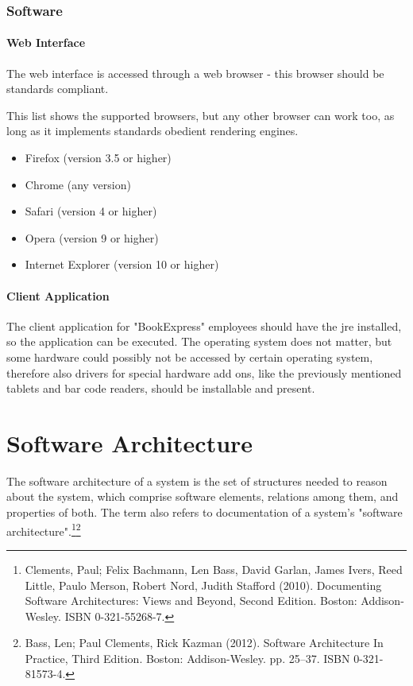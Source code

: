 \documentclass[11pt,a4paper,oneside,svgnames]{report}
\begin{document}
\subsection{Software}
\subsubsection{Web Interface}
The web interface is accessed through a web browser - this browser should be standards compliant.

This list shows the supported browsers, but any other browser can work too, as long as it implements standards obedient rendering engines.

\begin{itemize}
	\item Firefox (version 3.5 or higher)
	\item Chrome (any version)
	\item Safari (version 4 or higher)
	\item Opera (version 9 or higher)
	\item Internet Explorer (version 10 or higher)
\end{itemize}
\subsubsection{Client Application}
The client application for "BookExpress" employees should have the \gls{jre} installed, so the application can be executed. The operating system does not matter, but some hardware could possibly not be accessed by certain operating system, therefore also drivers for special hardware add ons, like the previously mentioned tablets and bar code readers, should be installable and present.

\chapter{Software Architecture}
The software architecture of a system is the set of structures needed to reason about the system, which comprise software elements, relations among them, and properties of both. The term also refers to documentation of a system's "software architecture".\footnote{ Clements, Paul; Felix Bachmann, Len Bass, David Garlan, James Ivers, Reed Little, Paulo Merson, Robert Nord, Judith Stafford (2010). Documenting Software Architectures: Views and Beyond, Second Edition. Boston: Addison-Wesley. ISBN 0-321-55268-7.}\footnote{Bass, Len; Paul Clements, Rick Kazman (2012). Software Architecture In Practice, Third Edition. Boston: Addison-Wesley. pp. 25–37. ISBN 0-321-81573-4.}
\end{document}

